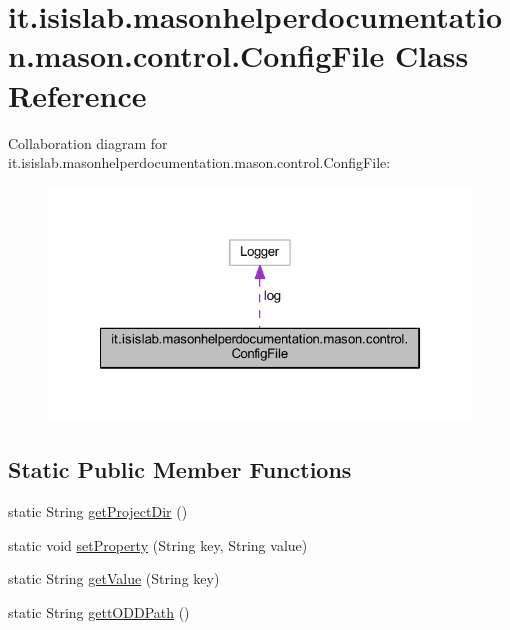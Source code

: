 \hypertarget{classit_1_1isislab_1_1masonhelperdocumentation_1_1mason_1_1control_1_1_config_file}{\section{it.\-isislab.\-masonhelperdocumentation.\-mason.\-control.\-Config\-File Class Reference}
\label{classit_1_1isislab_1_1masonhelperdocumentation_1_1mason_1_1control_1_1_config_file}
}


Collaboration diagram for it.\-isislab.\-masonhelperdocumentation.\-mason.\-control.\-Config\-File\-:\nopagebreak
\begin{figure}[H]
\begin{center}
\leavevmode
\includegraphics[width=322pt]{classit_1_1isislab_1_1masonhelperdocumentation_1_1mason_1_1control_1_1_config_file__coll__graph}
\end{center}
\end{figure}
\subsection*{Static Public Member Functions}
\begin{DoxyCompactItemize}
\item 
static String \hyperlink{classit_1_1isislab_1_1masonhelperdocumentation_1_1mason_1_1control_1_1_config_file_a609deb51ff8ee114a270bd65098e69ae}{get\-Project\-Dir} ()
\item 
static void \hyperlink{classit_1_1isislab_1_1masonhelperdocumentation_1_1mason_1_1control_1_1_config_file_a29d4bd9c148d1d7576cef7bcaf796172}{set\-Property} (String key, String value)
\item 
static String \hyperlink{classit_1_1isislab_1_1masonhelperdocumentation_1_1mason_1_1control_1_1_config_file_a7bcf08b34e48f0c5116d796d616113f0}{get\-Value} (String key)
\item 
static String \hyperlink{classit_1_1isislab_1_1masonhelperdocumentation_1_1mason_1_1control_1_1_config_file_a066e1a4a3eb3969e1d59776ba39caac1}{gett\-O\-D\-D\-Path} ()
\end{DoxyCompactItemize}
